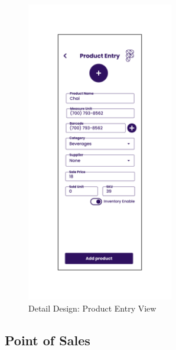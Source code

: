 \documentclass[../thesis.tex]{subfiles}
\begin{document}
\begin{figure}[H]
    \centering
    \includegraphics[width=0.57\textwidth]{images/DetailedDesign_Product_Entry.png}
    \caption{Detail Design: Product Entry View}
    \label{fig:DetailedDesign_Product_Entry}
\end{figure}

\subsection{Point of Sales}
\end{document}
